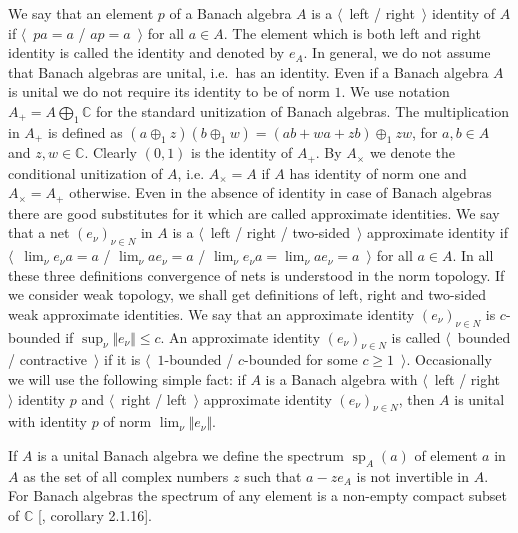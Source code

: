 We say that an element $p$ of a Banach algebra $A$ is a $\langle$~left /
right~$\rangle$ identity of $A$ if $\langle$~$pa=a$ / $ap=a$~$\rangle$ for all
$a\in A$. The element which is both left and right identity is called the
identity and denoted by $e_A$. In general, we do not assume that Banach algebras
are unital, i.e.\ has an identity. Even if a Banach algebra $A$ is unital we do
not require its identity to be of norm $1$. We use notation
$A_+=A\bigoplus_1\mathbb{C}$ for the standard unitization of Banach algebras.
The multiplication in $A_+$ is defined as $(a\oplus_1 z)(b\oplus_1
w)=(ab+wa+zb)\oplus_1 zw$, for $a,b\in A$ and $z,w\in\mathbb{C}$. Clearly
$(0,1)$ is the identity of $A_+$. By $A_\times$ we denote the conditional
unitization of $A$, i.e. $A_\times=A$ if $A$ has identity of norm one and
$A_\times=A_+$ otherwise. Even in the absence of identity in case of Banach
algebras there are good substitutes for it which are called approximate
identities. We say that a net ${(e_\nu)}_{\nu\in N}$ in $A$ is a 
$\langle$~left / right / two-sided~$\rangle$ approximate identity if 
$\langle$~$\lim_\nu e_\nu a=a$ / $\lim_\nu ae_\nu=a$ / 
$\lim_\nu e_\nu a=\lim_\nu ae_\nu=a$~$\rangle$ for
all $a\in A$. In all these three definitions convergence of nets is understood
in the norm topology. If we consider weak topology, we shall get
definitions of left, right and two-sided weak approximate identities. We say
that an approximate identity ${(e_\nu)}_{\nu\in N}$ is $c$-bounded if
$\sup_\nu\Vert e_\nu\Vert\leq c$. An approximate identity ${(e_\nu)}_{\nu\in N}$
is called $\langle$~bounded / contractive~$\rangle$ if it is
$\langle$~$1$-bounded / $c$-bounded for some $c\geq 1$~$\rangle$. Occasionally
we will use the following simple fact: if $A$ is a Banach algebra with
$\langle$~left / right~$\rangle$ identity $p$ and $\langle$~right /
left~$\rangle$ approximate identity ${(e_\nu)}_{\nu\in N}$, then $A$ is unital
with identity $p$ of norm $\lim_\nu\Vert e_\nu\Vert$. 

If $A$ is a unital Banach algebra we define the spectrum
$\operatorname{sp}_A(a)$ of element $a$ in $A$ as the set of all complex numbers
$z$ such that $a-ze_A$ is not invertible in $A$. For Banach algebras the
spectrum of any element is a non-empty compact subset of $\mathbb{C}$
[\cite{HelBanLocConvAlg}, corollary 2.1.16].

